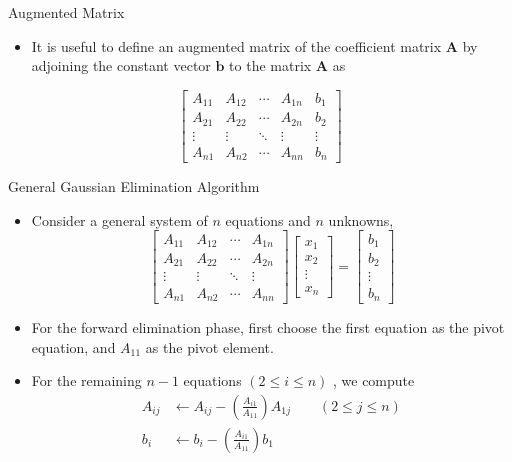 \documentclass{beamer}
\newcommand{\beforeverb}{\footnotesize}
\newcommand{\afterverb}{\normalsize}
\begin{document}
\begin{frame}{Augmented Matrix}
\begin{itemize}
\item It is  useful to define an \alert{augmented matrix} of the coefficient matrix $\mathbf{A}$ by adjoining the constant vector $\mathbf{b}$ to the matrix $\mathbf{A}$ as
\end{itemize}
\[
\left[ 
\begin{array}{cccc|c}
A_{11} & A_{12} & \cdots & A_{1n} &b_1 \\
A_{21} & A_{22} & \cdots & A_{2n} & b_2\\
\vdots & \vdots & \ddots & \vdots  & \vdots\\
A_{n1} & A_{n2} & \cdots & A_{nn} & b_n 
\end{array}
\right]
\]
\end{frame}

\begin{frame}{General Gaussian Elimination Algorithm}
\begin{itemize}
\item Consider a general system of $n$ equations and $n$ unknowns,
\beforeverb
\[
\left[ 
\begin{array}{cccc}
A_{11} & A_{12} & \cdots & A_{1n} \\
A_{21} & A_{22} & \cdots & A_{2n} \\
\vdots & \vdots & \ddots & \vdots \\
A_{n1} & A_{n2} & \cdots & A_{nn} 
\end{array}
\right]
\left[
\begin{array}{c}
x_1\\
x_2\\
\vdots\\
x_n
\end{array}
\right]
=
\left[
\begin{array}{c}
b_1\\
b_2\\
\vdots\\
b_n
\end{array}
\right]
\]
\afterverb 

\item For the forward elimination phase, first choose the first equation as the \alert{pivot equation}, and $A_{11}$ as the \alert{pivot element}. 
\item For the remaining $n-1$ equations $(2\le i \le n)$ , we compute 
\beforeverb
\begin{align*}
A_{ij}&\leftarrow A_{ij}- \left(\frac{A_{i1}}{A_{11}}\right)A_{1j}\quad \quad (2\le j\le n)\\
b_i &\leftarrow  b_i- \left(\frac{A_{i1}}{A_{11}}\right)b_1
\end{align*}
\afterverb
\end{itemize}

\end{frame}
\end{document}
